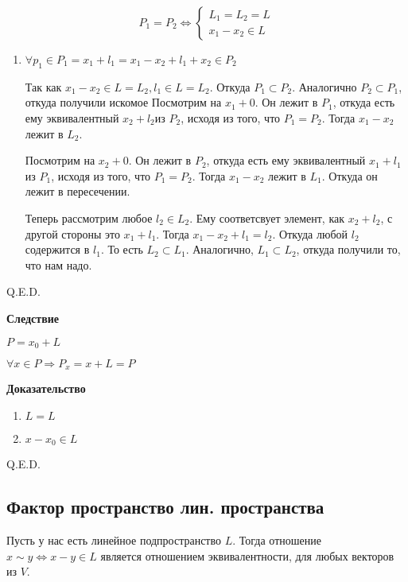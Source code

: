 \[
    P_1 = P_2 \Leftrightarrow
    \begin{cases*}
        L_1 = L_2 = L \\
        x_1 - x_2 \in L
    \end{cases*}
\]
\begin{enumerate}
    \item[] \prooff{}
          \fbox{\(\Leftarrow\)}
          $\forall p_1 \in P_1 = x_1 + l_1 = x_1-x_2 + l_1 + x_2 \in P_2$

          Так как $x_1-x_2 \in L = L_2, l_1 \in  L = L_2$. Откуда $P_1\subset P_2$. Аналогично $P_2 \subset P_1$, откуда получили искомое
          \fbox{\(\Rightarrow\)}
          Посмотрим на $x_1+0$. Он лежит в $P_1$, откуда есть ему эквивалентный $x_2+l_2$из $P_2$, исходя из того, что $P_1=P_2$. Тогда $x_1-x_2$ лежит в $L_2$.

          Посмотрим на $x_2+0$. Он лежит в $P_2$, откуда есть ему эквивалентный $x_1+l_1$из $P_1$, исходя из того, что $P_1=P_2$. Тогда $x_1-x_2$ лежит в $L_1$. Откуда он лежит в пересечении.

          Теперь рассмотрим любое $l_2 \in L_2$. Ему соответсвует элемент, как $x_2 + l_2$, с другой стороны это $x_1+l_1$. Тогда $x_1-x_2+l_1 = l_2$. Откуда любой $l_2$ содержится в $l_1$. То есть $L_2 \subset L_1$. Аналогично, $L_1 \subset L_2$, откуда получили то, что нам надо.


\end{enumerate}

\hfill Q.E.D.

\textbf{Следствие}

\(P = x_0 + L\)

\(\forall x \in P \Rightarrow P_x = x + L = P\)

\textbf{Доказательство}

\begin{enumerate}
    \item \(L = L\)

    \item \(x - x_0 \in L\)
\end{enumerate}

\hfill Q.E.D.
\subsection{Фактор пространство лин. пространства}

Пусть у нас есть линейное подпространство $L$. Тогда отношение $x\sim y\Leftrightarrow x-y\in L$ является отношением эквивалентности, для любых векторов из $V$.

